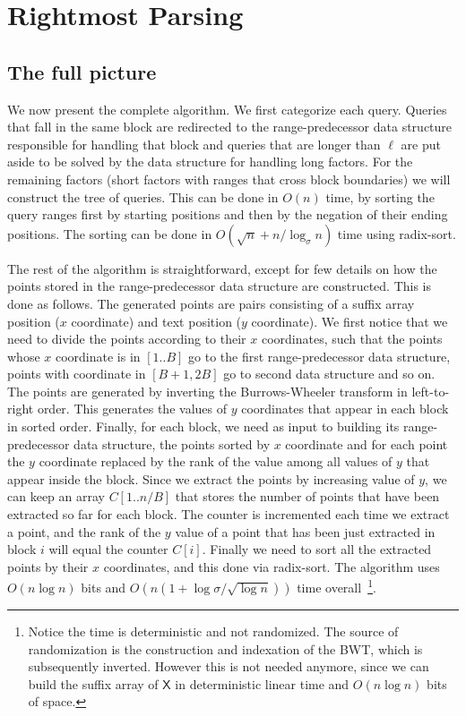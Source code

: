 \documentclass[11pt,runningheads]{llncs}
\def\X{\mathsf{X}}
\begin{document}
\section{Rightmost Parsing}

\subsection{The full picture}
\label{sec:time_efficient_rightmost}
We now present the complete algorithm. 
We first categorize each query.
Queries that fall in the same block are redirected 
to the range-predecessor data structure responsible 
for handling that block and queries that are longer 
than $\ell$ are put aside to be solved by the data structure 
for handling long factors. 
For the remaining factors (short factors with ranges 
that cross block boundaries) we will construct the tree of queries. 
This can be done 
in $O(n)$ time, by sorting the query ranges 
first by starting positions and then by the negation
of their ending positions. The sorting can be done 
in $O(\sqrt{n}+n/\log_\sigma n)$ time 
using 
radix-sort. 

The rest of the algorithm is straightforward, except for 
few details on how the points 
stored in the range-predecessor data structure are constructed. 
This is done as follows. The generated 
points are pairs consisting of a suffix array position ($x$ coordinate)
and text position ($y$ coordinate). 
We first notice that 
we need to divide the points according
to their $x$ coordinates, such that the points
whose $x$ coordinate is in $[1..B]$ go to the first range-predecessor 
data structure, points with coordinate in $[B+1,2B]$ 
go to second data structure and so on. 
The points are generated by inverting the Burrows-Wheeler 
transform in left-to-right order. This generates 
the values of $y$ coordinates that appear in each block in sorted order. 
Finally, for each block, we need as input to building its range-predecessor 
data structure, the 
points sorted by $x$ coordinate and for each point the $y$ coordinate 
replaced by the rank of the value among all values of $y$ that appear 
inside the block. Since we extract the points by increasing value 
of $y$, we can keep an array $C[1..n/B]$ that stores the number of points 
that have been extracted so far for each block. The counter is incremented 
each time we extract a point, and the rank of the $y$ value of a point 
that has been just extracted in block $i$ will equal the counter $C[i]$. 
Finally we need to sort all the extracted points by their $x$ coordinates, 
and this done via radix-sort. 
The algorithm uses $O(n\log n)$ bits and $O(n(1 + \log\sigma/\sqrt{\log n}))$ time 
overall~\footnote{Notice the time is deterministic and not randomized.  
The source of randomization is the construction and indexation of the BWT, 
which is subsequently inverted. However this is not needed anymore, since we can 
build the suffix array of $\X$ in deterministic linear time and $O(n\log n)$ bits of space.}.
\end{document}
